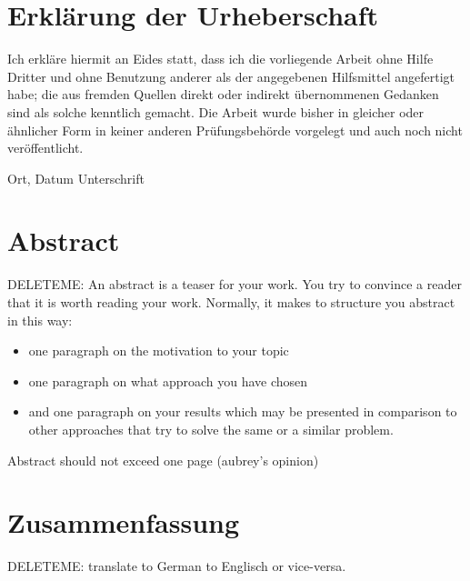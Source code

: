 \chapter*{Erkl{\"a}rung der Urheberschaft}
Ich erkl\"are hiermit an Eides statt, 
dass ich die vorliegende Arbeit ohne Hilfe Dritter 
und ohne Benutzung anderer als der angegebenen Hilfsmittel angefertigt habe; 
die aus fremden Quellen direkt 
oder indirekt \"ubernommenen Gedanken sind als solche kenntlich gemacht. 
Die Arbeit wurde bisher in gleicher oder \"ahnlicher Form 
in keiner anderen Pr\"ufungsbeh\"orde vorgelegt 
und auch noch nicht ver\"offentlicht.


\vspace{4cm}

Ort, Datum \hfill Unterschrift

\newpage
\chapter*{Abstract}
DELETEME: An abstract is a teaser for your work. You try to convince a reader that it is worth reading your work. Normally, it makes to structure you abstract in this way: 
\begin{itemize}
\item one paragraph on the motivation to your topic
\item one paragraph on what approach you have chosen
\item and one paragraph on your results which may be presented in comparison to other approaches that try to solve the same or a similar problem.
\end{itemize}
Abstract should not exceed one page (aubrey's opinion)

\newpage
\chapter*{Zusammenfassung}
DELETEME: translate to German to Englisch or vice-versa.

%

